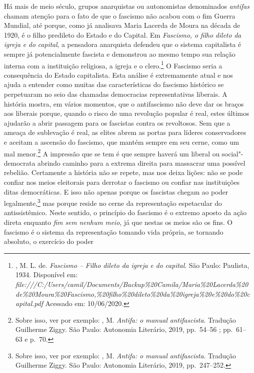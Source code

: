 Há mais de meio século, grupos anarquistas ou autonomistas denominados
\emph{antifas} chamam atenção para o fato de que o fascismo não acabou
com o fim  Guerra Mundial, até porque, como já analisava Maria Lacerda
de Moura na década de 1920, é o filho predileto do Estado e do Capital. Em
\emph{Fascismo, o filho dileto da igreja e do capital}, a pensadora
anarquista defendeu que o sistema capitalista é sempre já potencialmente
fascista e demonstrou ao mesmo tempo sua relação interna com a
instituição religiosa, a igreja e o clero.\footnote{, M. L. de.
  \emph{Fascismo -- Filho dileto da igreja e do capital}. São Paulo:
  Paulista, 1934. Disponível em:
  \emph{file:///C:/Users/camil/Documents/Backup\%20Camila/Maria\%20Lacerda\%20de\%20Moura\%20Fascismo,\%20filho\%20dileto\%20da\%20igreja\%20e\%20do\%20capital.pdf}
  Acessado em: 10/06/2020.} O Fascismo seria a consequência do Estado
capitalista. Esta análise é extremamente atual e nos ajuda a entender
como muitas das características do fascismo histórico se perpetuaram no
seio das chamadas democracias representativas liberais. A história
mostra, em vários momentos, que o antifascismo não deve dar os braços
aos liberais porque, quando o risco de uma revolução popular é real,
estes últimos ajudarão a abrir passagem para os fascistas contra os
revoltosos. Sem que a ameaça de sublevação é real, as elites abrem as
portas para líderes conservadores e aceitam a ascensão do fascismo, que
mantém sempre em seu cerne, como um mal menor.\footnote{Sobre isso, ver
  por exemplo: , M. \emph{Antifa: o manual antifascista}. Tradução
  Guilherme Ziggy. São Paulo: Autonomia Literário, 2019, pp.~54--56 ; pp.~61--63 e p.~70.} A impressão que se tem é que sempre haverá um liberal
ou social"-democrata abrindo caminho para a extrema direita para
massacrar uma possível rebelião. Certamente a história não se repete,
mas nos deixa lições: não se pode confiar nos meios eleitorais para
derrotar o fascismo ou confiar nas instituições ditas democráticas. E
isso não apenas porque os fascistas chegam ao poder legalmente,\footnote{Sobre
  isso, ver por exemplo: , M. \emph{Antifa: o manual antifascista}.
  Tradução Guilherme Ziggy. São Paulo: Autonomia Literário, 2019, pp.~247--252.} mas porque reside no cerne da representação espetacular do
antissistêmico. Neste sentido, o princípio do fascismo é o extremo
aposto da ação direta enquanto \emph{fim sem nenhum meio,} já que nestas
os meios são os fins. O fascismo é o sistema da representação
tomando vida própria, se tornando absoluto, o exercício do poder
